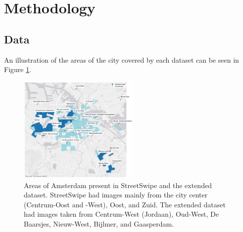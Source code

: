 \section{Methodology}
\label{sec:methodology}

\subsection{Data}

An illustration of the areas of the city covered by each dataset can be seen in Figure \ref{fig:map}.

{
\setlength\intextsep{7pt}
\begin{figure}[h!]
    \includegraphics[width=0.52\textwidth]{media/methodology/map/map3.png}
    \caption{Areas of Amsterdam present in StreetSwipe and the extended dataset. StreetSwipe had images mainly from the city center (Centrum-Oost and -West), Oost, and Zuid. The extended dataset had images taken from Centrum-West (Jordaan), Oud-West, De Baarsjes, Nieuw-West, Bijlmer, and Gaasperdam.}
    \label{fig:map}
\end{figure}
}

